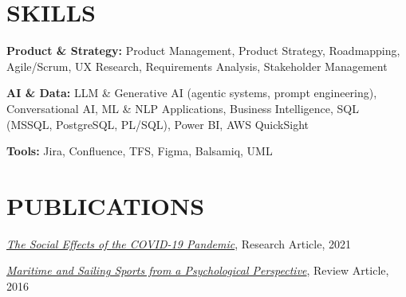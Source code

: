 \documentclass[10pt,letterpaper]{article}
\begin{document}
\section{SKILLS}
\textbf{Product \& Strategy:} Product Management, Product Strategy, Roadmapping, Agile/Scrum, UX Research, Requirements Analysis, Stakeholder Management\par
\vspace{1pt}
\textbf{AI \& Data:} LLM \& Generative AI (agentic systems, prompt engineering), Conversational AI, ML \& NLP Applications, Business Intelligence, SQL (MSSQL, PostgreSQL, PL/SQL), Power BI, AWS QuickSight\par
\vspace{1pt}
\textbf{Tools:} Jira, Confluence, TFS, Figma, Balsamiq, UML

\section{PUBLICATIONS}
\href{https://jag.journalagent.com/turkhijyen/pdfs/THDBD_78_3_235_248.pdf}{\textit{The Social Effects of the COVID-19 Pandemic}}, Research Article, 2021\par
\vspace{1pt}
\href{https://sporbilimleri.com.tr/yayin/psikolojik-acidan-denizcilik-ve-yelkencilik-sporlari}{\textit{Maritime and Sailing Sports from a Psychological Perspective}}, Review Article, 2016
\end{document}
